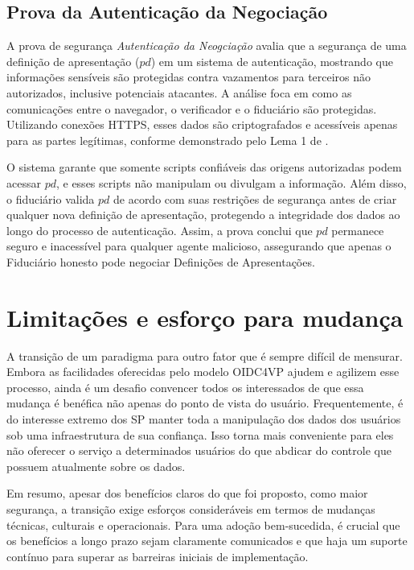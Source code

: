 \subsection{Prova da Autenticação da Negociação}

A prova de segurança \emph{Autenticação da Neogciação} avalia que a segurança de uma definição de apresentação ($pd$) em um sistema de autenticação, mostrando que informações sensíveis são protegidas contra vazamentos para terceiros não autorizados, inclusive potenciais atacantes. A análise foca em como as comunicações entre o navegador, o verificador e o fiduciário são protegidas. Utilizando conexões HTTPS, esses dados são criptografados e acessíveis apenas para as partes legítimas, conforme demonstrado pelo Lema 1 de .

O sistema garante que somente scripts confiáveis das origens autorizadas podem acessar $pd$, e esses scripts não manipulam ou divulgam a informação. Além disso, o fiduciário valida $pd$ de acordo com suas restrições de segurança antes de criar qualquer nova definição de apresentação, protegendo a integridade dos dados ao longo do processo de autenticação. Assim, a prova conclui que $pd$ permanece seguro e inacessível para qualquer agente malicioso, assegurando que apenas o Fiduciário honesto pode negociar Definições de Apresentações.

\section{Limitações e esforço para mudança}\label{section:limitacoes-esforco}

A transição de um paradigma para outro fator que é sempre difícil de mensurar. Embora as facilidades oferecidas pelo modelo \acs{OIDC4VP} ajudem e agilizem esse processo, ainda é um desafio convencer todos os interessados de que essa mudança é benéfica não apenas do ponto de vista do usuário. Frequentemente, é do interesse extremo dos \acs{SP} manter toda a manipulação dos dados dos usuários sob uma infraestrutura de sua confiança. Isso torna mais conveniente para eles não oferecer o serviço a determinados usuários do que abdicar do controle que possuem atualmente sobre os dados.

Em resumo, apesar dos benefícios claros do que foi proposto, como maior segurança, a transição exige esforços consideráveis em termos de mudanças técnicas, culturais e operacionais. Para uma adoção bem-sucedida, é crucial que os benefícios a longo prazo sejam claramente comunicados e que haja um suporte contínuo para superar as barreiras iniciais de implementação.